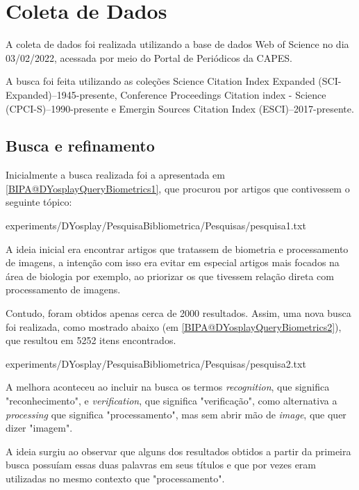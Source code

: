 \section{Coleta de Dados}

A coleta de dados foi realizada utilizando a base de dados Web of Science no dia 03/02/2022, acessada por meio do Portal de Periódicos da CAPES.

A busca foi feita utilizando as coleções Science Citation Index Expanded (SCI-Expanded)--1945-presente, Conference Proceedings Citation index - Science (CPCI-S)--1990-presente e Emergin Sources Citation Index (ESCI)--2017-presente.

\subsection{Busca e refinamento}
Inicialmente a busca realizada foi a apresentada em \ref{BIPA@DYosplayQueryBiometrics1}, que procurou por artigos que contivessem o seguinte tópico:



{experiments/DYosplay/PesquisaBibliometrica/Pesquisas/pesquisa1.txt}


A ideia inicial era encontrar artigos que tratassem de biometria e processamento de imagens, a intenção com isso era evitar em especial artigos mais focados na área de biologia por exemplo, ao priorizar os que tivessem relação direta com processamento de imagens.

Contudo, foram obtidos apenas cerca de 2000 resultados. Assim, uma nova busca foi realizada, como mostrado abaixo (em \ref{BIPA@DYosplayQueryBiometrics2}), que resultou em 5252 itens encontrados.


{experiments/DYosplay/PesquisaBibliometrica/Pesquisas/pesquisa2.txt}

A melhora aconteceu ao incluir na busca os termos \textit{recognition}, que significa "reconhecimento", e \textit{verification}, que significa "verificação", como alternativa a \textit{processing} que significa "processamento", mas sem abrir mão de \textit{image}, que quer dizer "imagem". 

A ideia surgiu ao observar que alguns dos resultados obtidos a partir da primeira busca possuíam essas duas palavras em seus títulos e que por vezes eram utilizadas no mesmo contexto que "processamento".

